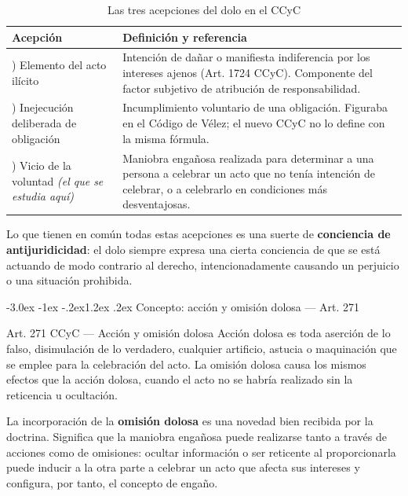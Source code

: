 \documentclass[12pt,oneside]{book}
\makeatletter
\renewcommand\section{\@startsection{section}{1}{\z@}%
  {-3.0ex \@plus -1ex \@minus -.2ex}{1.2ex \@plus .2ex}%
  {\normalfont\large\bfseries\color{acento}}}
\makeatother
\begin{document}
\begin{table}[H]
\centering
\begin{tabularx}{\textwidth}{>{\raggedright\arraybackslash}p{} >{\raggedright\arraybackslash}X}
\toprule
\textbf{Acepción} & \textbf{Definición y referencia} \\
\midrule
1) Elemento del acto ilícito & Intención de dañar o manifiesta indiferencia por los intereses ajenos (Art. 1724 CCyC). Componente del factor subjetivo de atribución de responsabilidad. \\[4pt]
2) Inejecución deliberada de obligación & Incumplimiento voluntario de una obligación. Figuraba en el Código de Vélez; el nuevo CCyC no lo define con la misma fórmula. \\[4pt]
3) Vicio de la voluntad \emph{(el que se estudia aquí)} & Maniobra engañosa realizada para determinar a una persona a celebrar un acto que no tenía intención de celebrar, o a celebrarlo en condiciones más desventajosas. \\
\bottomrule
\end{tabularx}
\caption{Las tres acepciones del dolo en el CCyC}
\end{table}

Lo que tienen en común todas estas acepciones es una suerte de \textbf{conciencia de antijuridicidad}: el dolo siempre expresa una cierta conciencia de que se está actuando de modo contrario al derecho, intencionadamente causando un perjuicio o una situación prohibida.

\section{Concepto: acción y omisión dolosa --- Art. 271}

\begin{articulo}{Art. 271 CCyC --- Acción y omisión dolosa}
Acción dolosa es toda aserción de lo falso, disimulación de lo verdadero, cualquier artificio, astucia o maquinación que se emplee para la celebración del acto. La omisión dolosa causa los mismos efectos que la acción dolosa, cuando el acto no se habría realizado sin la reticencia u ocultación.
\end{articulo}

La incorporación de la \textbf{omisión dolosa} es una novedad bien recibida por la doctrina. Significa que la maniobra engañosa puede realizarse tanto a través de acciones como de omisiones: ocultar información o ser reticente al proporcionarla puede inducir a la otra parte a celebrar un acto que afecta sus intereses y configura, por tanto, el concepto de engaño.
\end{document}
